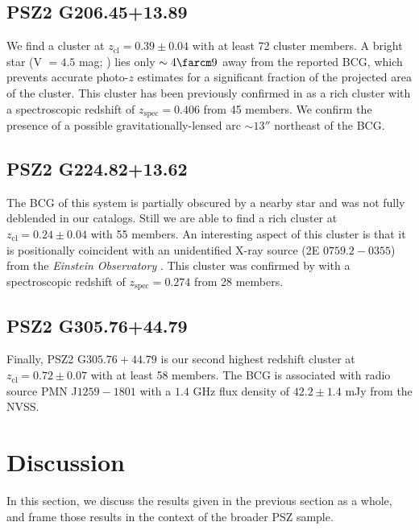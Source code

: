 \documentclass[apj, revtex4-1]{emulateapj}
\begin{document}
\subsection{PSZ2 G206.45+13.89} %
We find a cluster at $z_\mathrm{cl} = 0.39 \pm 0.04$ with at least 72 cluster members. A bright star (V $= 4.5$ mag; \citealt{Hog2000}) lies only $\sim4\farcm9$ away from the reported BCG, which prevents accurate photo-$z$ estimates for a significant fraction of the projected area of the cluster. This cluster has been previously confirmed in \cite{Barrena2018} as a rich cluster with a spectroscopic redshift of $z_\mathrm{spec} = 0.406$ from 45 members. We confirm the presence of a possible gravitationally-lensed arc $\sim13''$ northeast of the BCG.

\subsection{PSZ2 G224.82+13.62} %
The BCG of this system is partially obscured by a nearby star and was not fully deblended in our catalogs. Still we are able to find a rich cluster at $z_\mathrm{cl} = 0.24 \pm 0.04$ with 55 members. An interesting aspect of this cluster is that it is positionally coincident with an unidentified X-ray source (2E $0759.2-0355$) from the \textit{Einstein Observatory} \citep{Harris1990}. This cluster was confirmed by \cite{Barrena2018} with a spectroscopic redshift of $z_\mathrm{spec} = 0.274$ from 28 members.

\subsection{PSZ2 G305.76+44.79} %
Finally, PSZ2 G$305.76+44.79$ is our second highest redshift cluster at $z_\mathrm{cl} = 0.72 \pm 0.07$ with at least 58 members. The BCG is associated with radio source PMN J$1259-1801$ with a $1.4$ GHz flux density of $42.2\pm 1.4$ mJy from the NVSS.


\section{Discussion}\label{sec:discussion}
In this section, we discuss the results given in the previous section as a whole, and frame those results in the context of the broader PSZ sample.
\end{document}
